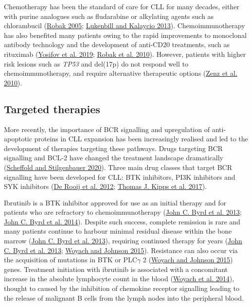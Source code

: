 \documentclass[11pt, a4paper, twosided]{book}
\begin{document}
Chemotherapy has been the standard of care for CLL for many decades, either with purine analogues such as fludarabine or alkylating agents such as chlorambucil (\protect\hyperlink{ref-Robak2005}{Robak 2005}; \protect\hyperlink{ref-Lukenbill2013}{Lukenbill and Kalaycio 2013}). Chemoimmunotherapy has also benefited many patients owing to the rapid improvements to monoclonal antibody technology and the development of anti-CD20 treatments, such as rituximab (\protect\hyperlink{ref-Yosifov2019}{Yosifov et al. 2019}; \protect\hyperlink{ref-Robak2010}{Robak et al. 2010}). However, patients with higher risk lesions such as \emph{TP53} and del(17p) do not respond well to chemoimmunotherapy, and require alternative therapeutic options (\protect\hyperlink{ref-Zenz2010}{Zenz et al. 2010}).

\hypertarget{intro-targeted-therapies}{%
\subsection{Targeted therapies}\label{intro-targeted-therapies}}

More recently, the importance of BCR signalling and upregulation of anti-apoptotic proteins in CLL expansion has been increasingly realised and led to the development of therapies targeting these pathways. Drugs targeting BCR signalling and BCL-2 have changed the treatment landscape dramatically (\protect\hyperlink{ref-Scheffold2020}{Scheffold and Stilgenbauer 2020}). Three main drug classes that target BCR signalling have been developed for CLL: BTK inhibitors, PI3K inhibitors and SYK inhibitors (\protect\hyperlink{ref-Rooij2012}{De Rooij et al. 2012}; \protect\hyperlink{ref-Kipps2017}{Thomas J. Kipps et al. 2017}).

Ibrutinib is a BTK inhibitor approved for use as an initial therapy and for patients who are refractory to chemoimmunotherapy (\protect\hyperlink{ref-Byrd2013}{John C. Byrd et al. 2013}; \protect\hyperlink{ref-Byrd2014}{John C. Byrd et al. 2014}). Despite such success, complete remission is rare and many patients continue to harbour minimal residual disease within the bone marrow (\protect\hyperlink{ref-Byrd2013}{John C. Byrd et al. 2013}), requiring continued therapy for years (\protect\hyperlink{ref-Byrd2013}{John C. Byrd et al. 2013}; \protect\hyperlink{ref-Woyach2015}{Woyach and Johnson 2015}). Resistance can also occur via the acquisition of mutations in BTK or PLC\(\gamma\) 2 (\protect\hyperlink{ref-Woyach2015}{Woyach and Johnson 2015}) genes. Treatment initiation with ibrutinib is associated with a concomitant increase in the absolute lymphocyte count in the blood (\protect\hyperlink{ref-Woyach2014}{Woyach et al. 2014}), thought to caused by the inhibition of chemokine receptor signalling leading to the release of malignant B cells from the lymph nodes into the peripheral blood.
\end{document}
